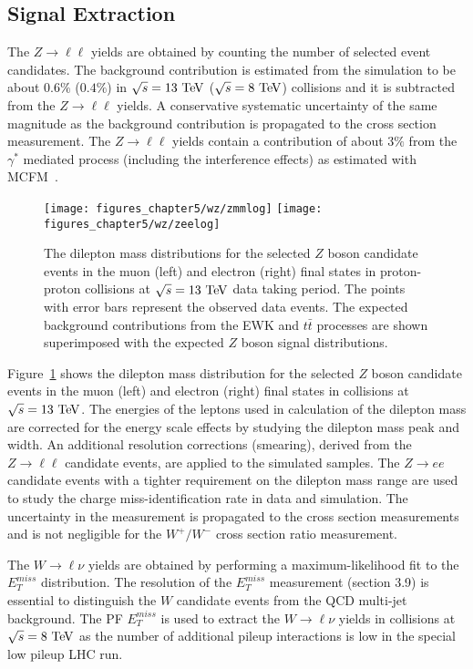 \subsection{Signal Extraction}

The $Z\rightarrow \ell\ell$ yields are obtained by counting the number of selected event candidates. The background contribution is estimated from the simulation to be about $0.6\%$ ($0.4\%$) in $\sqrt{s}=13~\mathrm{Te\kern -0.1em V}$ ($\sqrt{s}=8~\mathrm{Te\kern -0.1em V}$) collisions and it is subtracted from the $Z\rightarrow \ell\ell$ yields. A conservative systematic uncertainty of the same magnitude as the background contribution is propagated to the cross section measurement. The $Z\rightarrow \ell\ell$ yields contain a contribution of about $3\%$ from the $\gamma^{*}$ mediated process (including the interference effects) as estimated with MCFM~\cite{Campbell:2010ff}. 
\begin{figure}[h]
\centering
\texttt{[image: figures\_chapter5/wz/zmmlog]}
\texttt{[image: figures\_chapter5/wz/zeelog]}
\caption{The dilepton mass distributions for the selected $Z$ boson candidate events in the muon (left) and electron (right) final states in proton-proton collisions at $\sqrt{s}=13~\mathrm{Te\kern -0.1em V}$ data taking period. The points with error bars represent the observed data events. The expected background contributions from the EWK and $t\bar{t}$ processes are shown superimposed with the expected $Z$ boson signal distributions. 
\label{fig:z13}}
\end{figure}
Figure~\ref{fig:z13} shows the dilepton mass distribution for the selected $Z$ boson candidate events in the muon (left) and electron (right) final states in collisions at $\sqrt{s}=13~\mathrm{Te\kern -0.1em V}$. The energies of the leptons used in calculation of the dilepton mass are corrected for the energy scale effects by studying the dilepton mass peak and width. An additional resolution corrections (smearing), derived from the $Z \rightarrow \ell\ell$ candidate events, are applied to the simulated samples. The  $Z \rightarrow ee$ candidate events with a tighter requirement on the dilepton mass range are used to study the charge miss-identification rate in data and simulation. The uncertainty in the measurement is propagated to the cross section measurements and is not negligible for the $W^+/W^-$ cross section ratio measurement.      
 
 The $W \rightarrow \ell \nu$ yields are obtained by performing a maximum-likelihood fit to the $E_{T}^{miss}$ distribution. The resolution of the $E_{T}^{miss}$ measurement (section 3.9) is essential to distinguish the $W$ candidate events from the QCD multi-jet background. The PF $E_{T}^{miss}$ is used to extract the $W \rightarrow \ell \nu$ yields in collisions at $\sqrt{s}=8~\mathrm{Te\kern -0.1em V}$ as the number of additional pileup interactions is low in the special low pileup LHC run. 
 
